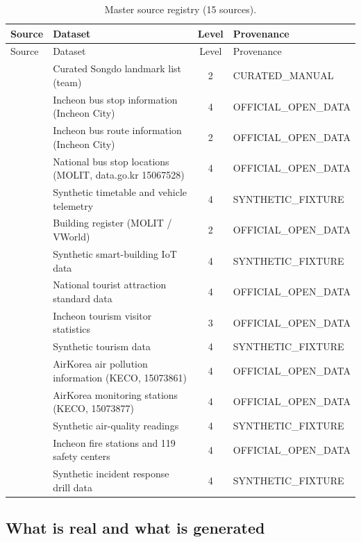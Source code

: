 \documentclass[11pt,a4paper]{article}
\begin{document}
\begingroup\small
\begin{xltabular}{\linewidth}{@{}p{2.3cm}Xcp{3.2cm}@{}}
\caption{Master source registry (15 sources).}\label{tab:sources}\\
\toprule
Source & Dataset & Level & Provenance \\
\midrule
\endfirsthead
\toprule
Source & Dataset & Level & Provenance \\
\midrule
\endhead
{} & Curated Songdo landmark list (team) & 2 & CURATED\_MANUAL \\
 & Incheon bus stop information (Incheon City) & 4 & OFFICIAL\_OPEN\_DATA \\
 & Incheon bus route information (Incheon City) & 2 & OFFICIAL\_OPEN\_DATA \\
 & National bus stop locations (MOLIT, data.go.kr 15067528) & 4 & OFFICIAL\_OPEN\_DATA \\
 & Synthetic timetable and vehicle telemetry & 4 & SYNTHETIC\_FIXTURE \\
 & Building register (MOLIT / VWorld) & 2 & OFFICIAL\_OPEN\_DATA \\
 & Synthetic smart-building IoT data & 4 & SYNTHETIC\_FIXTURE \\
 & National tourist attraction standard data & 4 & OFFICIAL\_OPEN\_DATA \\
 & Incheon tourism visitor statistics & 3 & OFFICIAL\_OPEN\_DATA \\
 & Synthetic tourism data & 4 & SYNTHETIC\_FIXTURE \\
 & AirKorea air pollution information (KECO, 15073861) & 4 & OFFICIAL\_OPEN\_DATA \\
 & AirKorea monitoring stations (KECO, 15073877) & 4 & OFFICIAL\_OPEN\_DATA \\
 & Synthetic air-quality readings & 4 & SYNTHETIC\_FIXTURE \\
 & Incheon fire stations and 119 safety centers & 4 & OFFICIAL\_OPEN\_DATA \\
 & Synthetic incident response drill data & 4 & SYNTHETIC\_FIXTURE \\
\bottomrule
\end{xltabular}
\endgroup

\subsection{What is real and what is generated}
\end{document}
